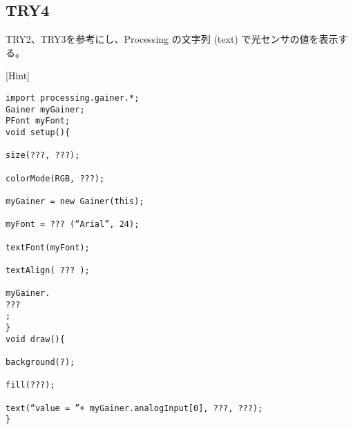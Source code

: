\documentclass[11pt,a4paper]{jarticle}
\begin{document}

\subsection*{TRY4}
TRY2、TRY3を参考にし、Processing の文字列 (text) で光センサの値を表示する。

[Hint]
\begin{lstlisting}
import processing.gainer.*;
Gainer myGainer;
PFont myFont;
void setup(){
	
size(???, ???);
	
colorMode(RGB, ???);
	
myGainer = new Gainer(this);
	
myFont = ??? (“Arial”, 24);
	
textFont(myFont);
	
textAlign( ??? );
	
myGainer.
???
;
}
void draw(){
	
background(?);
	
fill(???);
	
text(“value = ”+ myGainer.analogInput[0], ???, ???);
}
 
\end{lstlisting}
\end{document}
